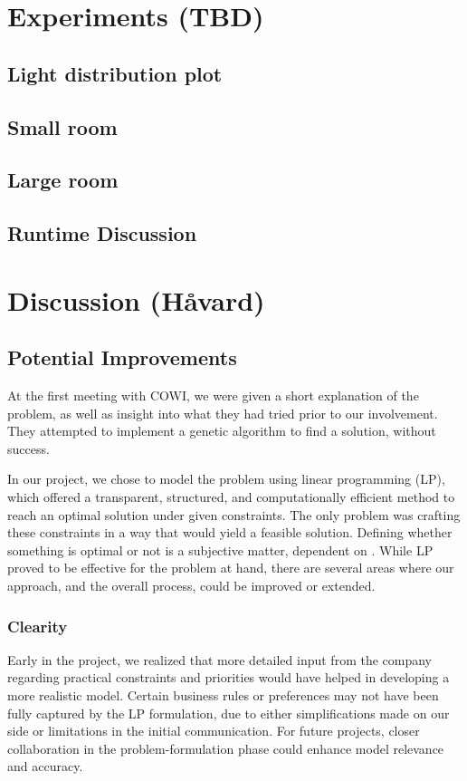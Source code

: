 \documentclass{article}
\begin{document}
\newpage

\section{Experiments (TBD)}
\subsection{Light distribution plot}
\subsection{Small room}
\subsection{Large room}
\subsection{Runtime Discussion}



\newpage

\section{Discussion (Håvard)}

\subsection{Potential Improvements}
At the first meeting with COWI, we were given a short explanation of the problem, as well as insight 
into what they had tried prior to our involvement. They attempted to implement a genetic algorithm 
to find a solution, without success.

In our project, we chose to model the problem using linear programming (LP), which offered a transparent, 
structured, and computationally efficient method to reach an optimal solution under given constraints. The 
only problem was crafting these constraints in a way that would yield a feasible solution. Defining whether something 
is optimal or not is a subjective matter, dependent on . While LP proved to 
be effective for the problem at hand, there are several areas where our approach, and the overall process, could be 
improved or extended. 

\subsubsection{Clearity}
Early in the project, we realized that more detailed input from the company regarding practical constraints 
and priorities would have helped in developing a more realistic model. Certain business rules or preferences 
may not have been fully captured by the LP formulation, due to either simplifications made on our side or 
limitations in the initial communication. For future projects, closer collaboration in the problem-formulation 
phase could enhance model relevance and accuracy.
\end{document}
